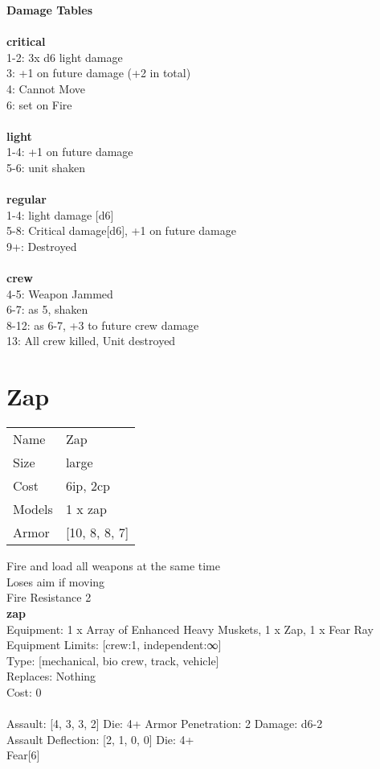 {\bf Damage Tables} \\
\ \\ {\bf critical } \\
1-2: 3x d6 light damage \\
3: +1 on future damage (+2 in total) \\
4: Cannot Move \\
6: set on Fire \\
\ \\ {\bf light } \\
1-4: +1 on future damage \\
5-6: unit shaken \\
\ \\ {\bf regular } \\
1-4: light damage [d6] \\
5-8: Critical damage[d6], +1 on future damage \\
9+: Destroyed \\
\ \\ {\bf crew } \\
4-5: Weapon Jammed \\
6-7: as 5, shaken \\
8-12: as 6-7, +3 to future crew damage \\
13: All crew killed, Unit destroyed \\










\pagebreak\pagebreak

\section{ Zap }

\begin{tabular}{ll}
  Name & Zap \\
  Size & large\\
  Cost & 6ip, 2cp\\
  Models & 1 x zap\\
  Armor & [10, 8, 8, 7]\\
\end{tabular}

\noindent Fire and load all weapons at the same time\\ 
Loses aim if moving\\ 
Fire Resistance 2\\ 


{\bf zap } \\
Equipment: 1 x Array of Enhanced Heavy Muskets, 1 x Zap, 1 x Fear Ray \\
Equipment Limits: [crew:1, independent:∞] \\
Type: [mechanical, bio crew, track, vehicle] \\
Replaces: Nothing \\
Cost: 0\\
\ \\
Assault: [4, 3, 3, 2] Die: 4+ Armor Penetration: 2 Damage: d6-2 \\
Assault Deflection: [2, 1, 0, 0] Die: 4+\\
\indent Fear[6]\\ 
 
